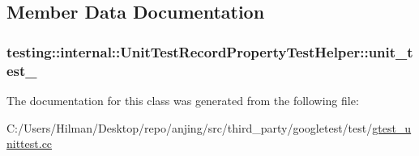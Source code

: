 \subsection{Member Data Documentation}
\hypertarget{classtesting_1_1internal_1_1_unit_test_record_property_test_helper_a415e13a354d3b8bd97db96aae5ef5df1}{}
\subsubsection[{unit\+\_\+test\+\_\+}]{ testing\+::internal\+::\+Unit\+Test\+Record\+Property\+Test\+Helper\+::unit\+\_\+test\+\_\+\hspace{0.3cm}{\ttfamily [protected]}}\label{classtesting_1_1internal_1_1_unit_test_record_property_test_helper_a415e13a354d3b8bd97db96aae5ef5df1}


The documentation for this class was generated from the following file\+:\begin{DoxyCompactItemize}
\item 
C\+:/\+Users/\+Hilman/\+Desktop/repo/anjing/src/third\+\_\+party/googletest/test/\hyperlink{gtest__unittest_8cc}{gtest\+\_\+unittest.\+cc}\end{DoxyCompactItemize}
